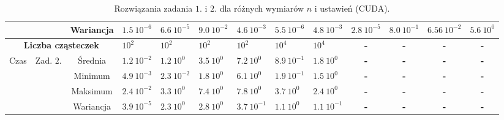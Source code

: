 \documentclass[11pt, a4paper, oneside]{article}
\begin{document}
\begin{table}[t]
\begin{adjustwidth}{-1.76cm}{}
\begin{tabular}{|c|c|c|l|l|l|l|l|l|c|c|c|c|}
                      &                            & Wariancja & $1.5 \ 10^{-6}$          & $6.6 \ 10^{-5}$         & $9.0 \ 10^{-2}$          & $4.6 \ 10^{-3}$         & $5.5 \ 10^{-6}$          & $4.8 \ 10^{-3}$         & \multicolumn{1}{l|}{$2.8 \ 10^{-5}$}   & \multicolumn{1}{l|}{$8.0 \ 10^{-1}$}   & \multicolumn{1}{l|}{$6.56 \ 10^{-2}$}  & \multicolumn{1}{l|}{$5.6 \ 10^{0}$}    \\ \hline
\multicolumn{3}{|c|}{\textbf{Liczba cząsteczek}}               & \textbf{$10^{2}$}        & \textbf{$10^{2}$}       & \textbf{$10^{2}$}        & \textbf{$10^{2}$}       & \textbf{$10^{4}$}        & \textbf{$10^{4}$}       & \textbf{-}                             & \textbf{-}                             & \textbf{-}                             & \textbf{-}                             \\ \hline
\multirow{4}{*}{Czas} & Zad. $2$.                  & Średnia   & $1.2 \ 10^{-2}$          & $1.2 \ 10^{0}$          & $3.5 \ 10^{0}$           & $7.2 \ 10^{0}$          & $8.9 \ 10^{-1}$          & $1.8 \ 10^{0}$          & \textbf{-}                             & \textbf{-}                             & \textbf{-}                             & \textbf{-}                             \\ \cline{3-13} 
                      &                            & Minimum   & $4.9 \ 10^{-3}$          & $2.3 \ 10^{-2}$         & $1.8 \ 10^{0}$           & $6.1 \ 10^{0}$          & $1.9 \ 10^{-1}$          & $1.5 \ 10^{0}$          & \textbf{-}                             & \textbf{-}                             & \textbf{-}                             & \textbf{-}                             \\ \cline{3-13} 
                      &                            & Maksimum  & $2.4 \ 10^{-2}$          & $3.3 \ 10^{0}$          & $7.4 \ 10^{0}$           & $7.8 \ 10^{0}$          & $3.7 \ 10^{0}$           & $2.4 \ 10^{0}$          & \textbf{-}                             & \textbf{-}                             & \textbf{-}                             & \textbf{-}                             \\ \cline{3-13} 
                      &                            & Wariancja & $3.9 \ 10^{-5}$          & $2.3 \ 10^{0}$          & $2.8 \ 10^{0}$           & $3.7 \ 10^{-1}$         & $1.1 \ 10^{0}$           & $1.1 \ 10^{-1}$         & \textbf{-}                             & \textbf{-}                             & \textbf{-}                             & \textbf{-}                             \\ \hline
\end{tabular}
\end{adjustwidth}
\caption{Rozwiązania zadania $1$. i $2$. dla różnych wymiarów $n$ i ustawień (CUDA).}
\label{tab:CUDA}
\end{table}
\end{document}
